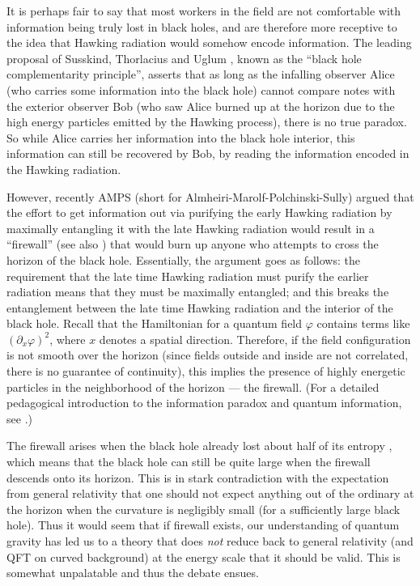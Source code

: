 \documentclass[12pt]{article}
\newcommand{\2}{$^2$}
\newcommand{\3}{$^3$}
\newcommand{\4}{$_4$}
\newcommand{\5}{$_5$}
\begin{document}
It is perhaps fair to say that most workers in the field are not comfortable with information being truly lost in black holes, and are therefore more receptive to the idea that Hawking radiation would somehow encode information. The leading proposal of Susskind, Thorlacius and Uglum \cite{STU}, known as the ``black hole complementarity principle'', asserts that as long as the infalling observer Alice (who carries some information into the black hole) cannot compare notes with the exterior observer Bob (who saw Alice burned up at the horizon due to the high energy particles emitted by the Hawking process), there is no true paradox. So while Alice carries her information into the black hole interior, this information can still be recovered by Bob, by reading the information encoded in the Hawking radiation.

However, recently AMPS (short for Almheiri-Marolf-Polchinski-Sully) \cite{amps, apologia} argued that the effort to get information out via purifying the early Hawking radiation by maximally entangling it with the late Hawking radiation would result in a ``firewall''  (see also \cite{sam}) that would burn up anyone who attempts to cross the horizon of the black hole. Essentially, the argument goes as follows: the requirement that the late time Hawking radiation must purify the earlier radiation means that they must be maximally entangled; and this breaks the entanglement between the late time Hawking radiation and the interior of the black hole. Recall that the Hamiltonian for a quantum field $\varphi$ contains terms like $(\partial_x \varphi)^2$, where $x$ denotes a spatial direction. Therefore, if the field configuration is not smooth over the horizon (since fields outside and inside are not correlated, there is no guarantee of continuity), this implies the presence of highly energetic particles in the neighborhood of the horizon --- the firewall. (For a detailed pedagogical introduction to the information paradox and quantum information, see \cite{harlow}.)

The firewall arises when the black hole already lost about half of its entropy \cite{page1, page2}, which means that the black hole can still be quite large when the firewall descends onto its horizon. This is in stark contradiction with the expectation from general relativity that one should not expect anything out of the ordinary at the horizon when the curvature is negligibly small (for a sufficiently large black hole). Thus it would seem that if firewall exists, our understanding of quantum gravity has led us to a theory that does \emph{not} reduce back to general relativity (and QFT on curved background) at the energy scale that it should be valid. This is somewhat unpalatable and thus the debate ensues. 
\end{document}
